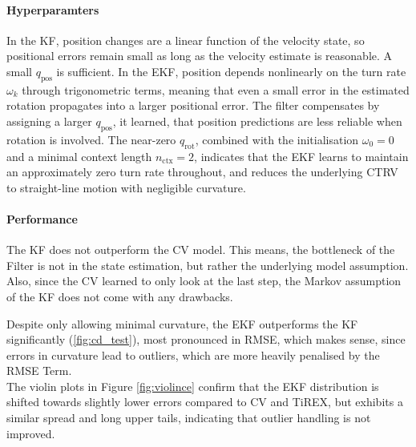                     \paragraph{Hyperparamters}
    
                    
                    In the \ac{KF}, position changes are a linear function of the velocity
                    state, so positional errors remain small as long as the velocity estimate
                    is reasonable.  A small $q_\text{pos}$ is sufficient.
                    In the \ac{EKF}, position depends nonlinearly on the turn rate $\omega_k$
                    through trigonometric terms, meaning that even a small error in the
                    estimated rotation propagates into a larger positional error.
                    The filter compensates by assigning a larger $q_\text{pos}$, it learned, that position predictions are less reliable when
                    rotation is involved. The near-zero $q_\text{rot}$, combined with the initialisation
                    $\omega_0 = 0$ and a minimal context length $n_\text{ctx} = 2$,
                    indicates that the \ac{EKF} learns to maintain an approximately
                    zero turn rate throughout, and reduces the underlying \ac{CTRV} to
                    straight-line motion with negligible curvature.
                
                    \paragraph{Performance}
                    The \ac{KF} does not outperform the \ac{CV} model. This means, the bottleneck of the Filter is not in the state estimation, but rather the underlying model assumption.
                    Also, since the \ac{CV} learned to only look at the last step, the Markov assumption of the \ac{KF} does not come with any drawbacks.
                    
                    Despite only allowing minimal curvature, the \ac{EKF} outperforms the \ac{KF} significantly (\ref{fig:cd_test}), most pronounced in RMSE, which makes sense, since errors in curvature lead to outliers, which are more heavily penalised by the \ac{RMSE} Term.\\
                    The  violin plots in Figure \ref{fig:violince} confirm that the \ac{EKF} distribution is shifted towards slightly lower errors compared to \ac{CV} and TiREX, but exhibits a similar spread and long upper tails, indicating that outlier handling is not improved. 
                   
